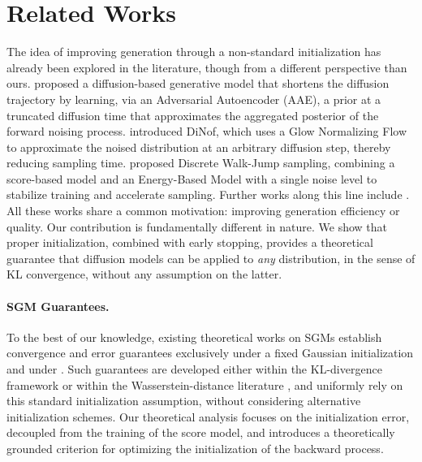 \section{Related Works}
The idea of improving generation through a non-standard initialization has already been explored in the literature, though from a different perspective than ours. \citep{zheng2023truncated} proposed a diffusion-based generative model that shortens the diffusion trajectory by learning, via an Adversarial Autoencoder (AAE), a prior at a truncated diffusion time that approximates the aggregated posterior of the forward noising process. \citep{zand2024diffusion} introduced DiNof, which uses a Glow Normalizing Flow to approximate the noised distribution at an arbitrary diffusion step, thereby reducing sampling time. \citep{DBLP:journals/corr/abs-2306-12360} proposed Discrete Walk-Jump sampling, combining a score-based model and an Energy-Based Model with a single noise level to stabilize training and accelerate sampling. Further works along this line include \citep{lee2022priorgrad, shen2025information, scholz2026warm}.
All these works share a common motivation: improving generation efficiency or quality. Our contribution is fundamentally different in nature. We show that proper initialization, combined with early stopping, provides a theoretical guarantee that diffusion models can be applied to \textit{any} distribution, in the sense of KL convergence, without any assumption on the latter.
\paragraph{SGM Guarantees. }
To the best of our knowledge, existing theoretical works on SGMs establish convergence and error guarantees exclusively under a fixed Gaussian initialization and under . Such guarantees are developed either within the KL-divergence framework \citep{conforti2023kl} or within the Wasserstein-distance literature \citep{debortoli2022convergence,strasman2025analysis,strasman2025wasserstein,gao2025wasserstein,bruno2024wasserstein,silveri2025beyond}, and uniformly rely on this standard initialization assumption, without considering alternative initialization schemes. Our theoretical analysis focuses on the initialization error, decoupled from the training of the score model, and introduces a theoretically grounded criterion for optimizing the initialization of the backward process.
